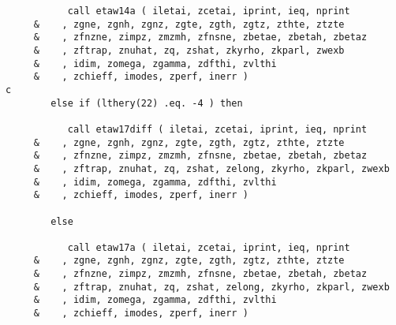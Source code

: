 \begin{verbatim}
           call etaw14a ( iletai, zcetai, iprint, ieq, nprint
     &    , zgne, zgnh, zgnz, zgte, zgth, zgtz, zthte, ztzte
     &    , zfnzne, zimpz, zmzmh, zfnsne, zbetae, zbetah, zbetaz
     &    , zftrap, znuhat, zq, zshat, zkyrho, zkparl, zwexb
     &    , idim, zomega, zgamma, zdfthi, zvlthi
     &    , zchieff, imodes, zperf, inerr )
c
        else if (lthery(22) .eq. -4 ) then

           call etaw17diff ( iletai, zcetai, iprint, ieq, nprint
     &    , zgne, zgnh, zgnz, zgte, zgth, zgtz, zthte, ztzte
     &    , zfnzne, zimpz, zmzmh, zfnsne, zbetae, zbetah, zbetaz
     &    , zftrap, znuhat, zq, zshat, zelong, zkyrho, zkparl, zwexb
     &    , idim, zomega, zgamma, zdfthi, zvlthi
     &    , zchieff, imodes, zperf, inerr )

        else

           call etaw17a ( iletai, zcetai, iprint, ieq, nprint
     &    , zgne, zgnh, zgnz, zgte, zgth, zgtz, zthte, ztzte
     &    , zfnzne, zimpz, zmzmh, zfnsne, zbetae, zbetah, zbetaz
     &    , zftrap, znuhat, zq, zshat, zelong, zkyrho, zkparl, zwexb
     &    , idim, zomega, zgamma, zdfthi, zvlthi
     &    , zchieff, imodes, zperf, inerr )


\end{verbatim}
